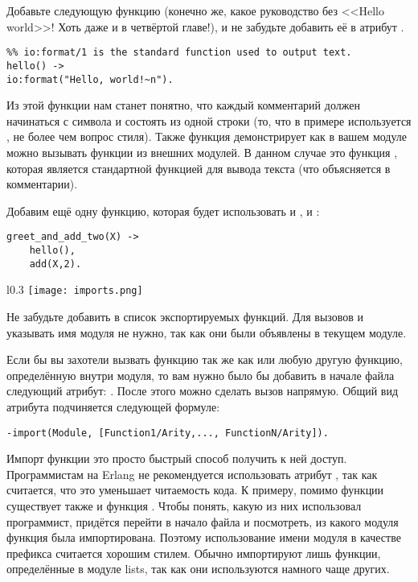 Добавьте следующую функцию (конечно же, какое руководство без <<Hello world>>!
Хоть даже и в четвёртой главе!), и не забудьте добавить её в атрибут .
\begin{lstlisting}[style=erlang]
%% Shows greetings.
%% io:format/1 is the standard function used to output text.
hello() ->
io:format("Hello, world!~n").
\end{lstlisting}

Из этой функции нам станет понятно, что каждый комментарий должен начинаться с символа \ops{\%} и состоять из одной строки (то, что в примере используется \ops{\%\%}, не более чем вопрос стиля).
Также функция  демонстрирует как в вашем модуле можно вызывать функции из внешних модулей.
В данном случае это функция , которая является стандартной функцией для вывода текста (что объясняется в комментарии).

Добавим ещё одну функцию, которая будет использовать и , и :
\begin{lstlisting}[style=erlang]
greet_and_add_two(X) ->
    hello(),
    add(X,2).
\end{lstlisting}
\begin{wrapfigure}[8]{l}{0.3\linewidth}
    \texttt{[image: imports.png]}
\end{wrapfigure}

Не забудьте добавить в список экспортируемых функций.
Для вызовов  и  указывать имя модуля не нужно, так как они были объявлены в текущем модуле.

Если бы вы захотели вызвать функцию  так же как  или любую другую функцию, определённую внутри модуля, то вам нужно было бы добавить в начале файла следующий атрибут: .
После этого можно сделать вызов  напрямую.
Общий вид атрибута  подчиняется следующей формуле:
\begin{lstlisting}[style=erlang]
-import(Module, [Function1/Arity,..., FunctionN/Arity]).
\end{lstlisting}

Импорт функции это просто быстрый способ получить к ней доступ.
Программистам на Erlang не рекомендуется использовать атрибут , так как считается, что это уменьшает читаемость кода.
К примеру, помимо функции  существует также и функция .
Чтобы понять, какую из них использовал программист, придётся перейти в начало файла и посмотреть, из какого модуля функция была импортирована.
Поэтому использование имени модуля в качестве префикса считается хорошим стилем.
Обычно импортируют лишь функции, определённые в модуле lists, так как они используются намного чаще других.

